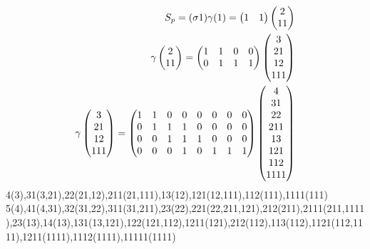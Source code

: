 	\begin{todo}[ここまで]\label{todo:ここまで} %
	\begin{equation*}\begin{split} %
		S_p = (\sigma1)\grow(1) = \begin{pmatrix}
			1 & 1
		\end{pmatrix}\begin{pmatrix}
			2 \\ 11
		\end{pmatrix}\\
		\grow\begin{pmatrix}
			2 \\ 11
		\end{pmatrix} = \begin{pmatrix}
			1 & 1 & 0 & 0 \\
			0 & 1 & 1 & 1 \\
		\end{pmatrix}\begin{pmatrix}
			3 \\ 21 \\ 12 \\ 111
		\end{pmatrix} \\
		\grow\begin{pmatrix}
			3 \\ 21 \\ 12 \\ 111
		\end{pmatrix} = \begin{pmatrix}
			1 & 1 & 0 & 0 & 0 & 0 & 0 & 0 \\
			0 & 1 & 1 & 1 & 0 & 0 & 0 & 0 \\
			0 & 0 & 1 & 1 & 1 & 0 & 0 & 0 \\
			0 & 0 & 0 & 1 & 0 & 1 & 1 & 1 \\
		\end{pmatrix}\begin{pmatrix}
			4 \\ 31 \\ 22 \\ 211 \\ 13 \\ 121 \\ 112 \\ 1111
		\end{pmatrix} \\
	\end{split}\end{equation*} %
4(3),31(3,21),22(21,12),211(21,111),13(12),121(12,111),112(111),1111(111)
5(4),41(4,31),32(31,22),311(31,211),23(22),221(22,211,121),212(211),2111(211,1111),23(13),14(13),131(13,121),122(121,112),1211(121),212(112),113(112),1121(112,1111),1211(1111),1112(1111),11111(1111)
	\end{todo} %
